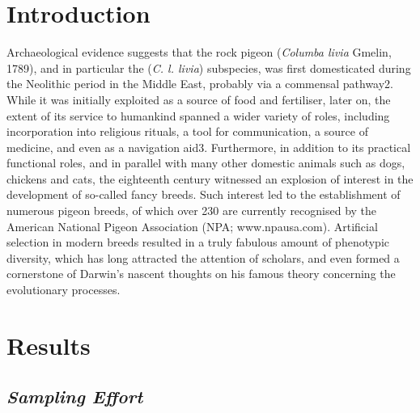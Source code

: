 \documentclass[a4paper]{article}
\begin{document}
\newpage


\section{Introduction}

Archaeological evidence suggests that the rock pigeon (\textit{Columba livia} Gmelin, 1789), and in particular the (\textit{C. l. livia}) subspecies, was first domesticated during the Neolithic period in the Middle East, probably via a commensal pathway2. While it was initially exploited as a source of food and fertiliser, later on, the extent of its service to humankind spanned a wider variety of roles, including incorporation into religious rituals, a tool for communication, a source of medicine, and even as a navigation aid3. Furthermore, in addition to its practical functional roles, and in parallel with many other domestic animals such as dogs, chickens and cats, the eighteenth century witnessed an explosion of interest in the development of so-called fancy breeds. Such interest led to the establishment of numerous pigeon breeds, of which over 230 are currently recognised by the American National Pigeon Association (NPA; www.npausa.com). Artificial selection in modern breeds resulted in a truly fabulous amount of phenotypic diversity, which has long attracted the attention of scholars, and even formed a cornerstone of Darwin’s nascent thoughts on his famous theory concerning the evolutionary processes.\



\section{Results}

\subsection{\textit{Sampling Effort}}
\end{document}
